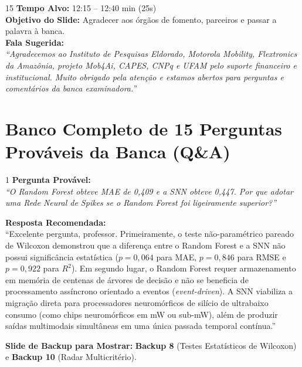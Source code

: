 \documentclass[11pt,a4paper]{article}
\begin{document}
\begin{slidebox}{15}
\textbf{Tempo Alvo:} 12:15 -- 12:40 min (25s)\\[3pt]
\textbf{Objetivo do Slide:} Agradecer aos órgãos de fomento, parceiros e passar a palavra à banca.\\[3pt]
\textbf{Fala Sugerida:}\\
\textit{``Agradecemos ao Instituto de Pesquisas Eldorado, Motorola Mobility, Flextronics da Amazônia, projeto Mob4Ai, CAPES, CNPq e UFAM pelo suporte financeiro e institucional. Muito obrigado pela atenção e estamos abertos para perguntas e comentários da banca examinadora.''}
\end{slidebox}

\newpage
\section{Banco Completo de 15 Perguntas Prováveis da Banca (Q\&A)}

\begin{qnabox}{1}
\textbf{Pergunta Provável:}\\
\textit{``O Random Forest obteve MAE de 0,409 e a SNN obteve 0,447. Por que adotar uma Rede Neural de Spikes se o Random Forest foi ligeiramente superior?''}

\vspace{0.2cm}
\textbf{Resposta Recomendada:}\\
``Excelente pergunta, professor. Primeiramente, o teste não-paramétrico pareado de Wilcoxon demonstrou que a diferença entre o Random Forest e a SNN não possui significância estatística ($p = 0{,}064$ para MAE, $p = 0{,}846$ para RMSE e $p = 0{,}922$ para $R^2$). Em segundo lugar, o Random Forest requer armazenamento em memória de centenas de árvores de decisão e não se beneficia de processamento assíncrono orientado a eventos (\textit{event-driven}). A SNN viabiliza a migração direta para processadores neuromórficos de silício de ultrabaixo consumo (como chips neuromórficos em mW ou sub-mW), além de produzir saídas multimodais simultâneas em uma única passada temporal contínua.''

\vspace{0.2cm}
\textbf{Slide de Backup para Mostrar:} \textbf{Backup 8} (Testes Estatísticos de Wilcoxon) e \textbf{Backup 10} (Radar Multicritério).
\end{qnabox}
\end{document}
